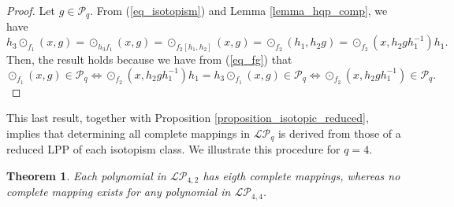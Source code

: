 \documentclass[pdflatex,sn-mathphys-num]{sn-jnl}
\theoremstyle{thmstyleone}%
\newtheorem{theorem}{Theorem}[section]
\begin{document}
\begin{proof} Let $g\in\mathcal{P}_q$.  From (\ref{eq_isotopism}) and Lemma \ref{lemma_hqp_comp}, we have
\[h_3\odot_{f_1}(x,g)=\odot_{h_3f_1}(x,g)=\odot_{f_2[h_1,h_2]}(x,g)=\odot_{f_2}(h_1,h_2g)=\odot_{f_2}\left(x,h_2gh_1^{-1}\right)h_1.\]
Then, the result holds because we have from (\ref{eq_fg}) that
\[\odot_{f_1}(x,g)\in\mathcal{P}_q \Leftrightarrow \odot_{f_2}\left(x,h_2gh_1^{-1}\right)h_1=h_3\odot_{f_1}(x,g)\in\mathcal{P}_q \Leftrightarrow \odot_{f_2}\left(x,h_2gh_1^{-1}\right)\in\mathcal{P}_q.\]
\end{proof}

\vspace{0.2cm}

This last result, together with Proposition \ref{proposition_isotopic_reduced}, implies that determining all complete mappings in $\mathcal{LP}_q$ is derived from those of a reduced LPP of each isotopism class. We illustrate this procedure for $q=4$.

\begin{theorem}\label{theorem_cm4} Each polynomial in $\mathcal{LP}_{4,2}$ has eigth complete mappings, whereas no complete mapping exists for any polynomial in $\mathcal{LP}_{4,4}$.
\end{theorem}
\end{document}
